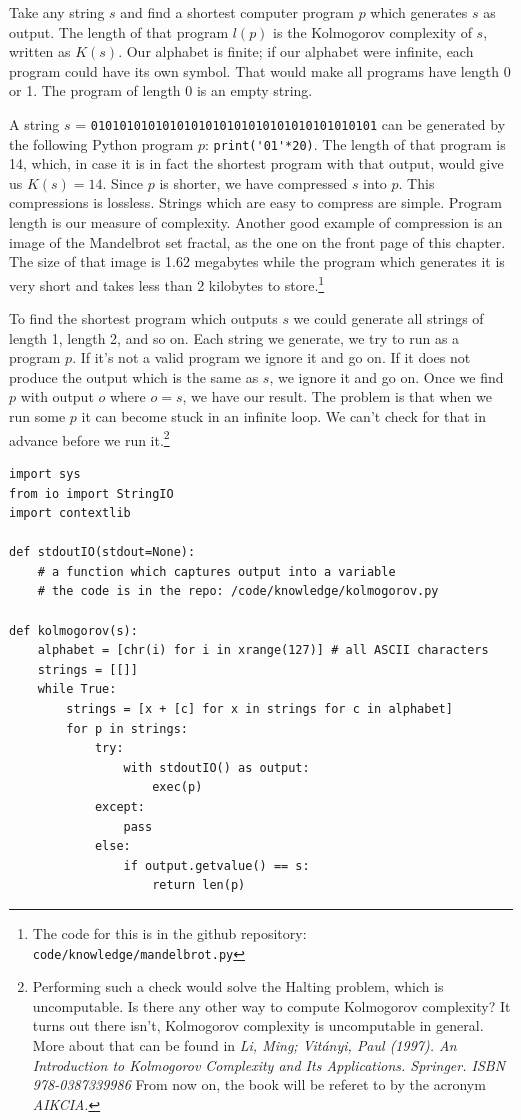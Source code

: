 Take any string $s$ and find a shortest computer program $p$ which generates $s$ as output.
The length of that program $l(p)$ is the Kolmogorov complexity of $s$, written as $K(s)$.
Our alphabet is finite; if our alphabet were infinite, each program could have its own symbol.
That would make all programs have length 0 or 1.
The program of length 0 is an empty string.

A string $s$ = \texttt{0101010101010101010101010101010101010101} can be generated by the following Python program $p$: \verb|print('01'*20)|.
The length of that program is 14, which, in case it is in fact the shortest program with that output, would give us $K(s) = 14$.
Since $p$ is shorter, we have compressed $s$ into $p$.
This compressions is lossless.
Strings which are easy to compress are simple.
Program length is our measure of complexity.
Another good example of compression is an image of the Mandelbrot set fractal, as the one on the front page of this chapter.
The size of that image is 1.62 megabytes while the program which generates it is very short and takes less than 2 kilobytes to store.\footnote{The code for this is in the github repository: \texttt{code/knowledge/mandelbrot.py}}

To find the shortest program which outputs $s$ we could generate all strings of length 1, length 2, and so on.
Each string we generate, we try to run as a program $p$.
If it's not a valid program we ignore it and go on.
If it does not produce the output which is the same as $s$, we ignore it and go on.
Once we find $p$ with output $o$ where $o = s$, we have our result.
The problem is that when we run some $p$ it can become stuck in an infinite loop.
We can't check for that in advance before we run it.\footnote{
Performing such a check would solve the Halting problem, which is uncomputable.
Is there any other way to compute Kolmogorov complexity?
It turns out there isn't, Kolmogorov complexity is uncomputable in general.
More about that can be found in \textit{Li, Ming; Vitányi, Paul (1997). An Introduction to Kolmogorov Complexity and Its Applications. Springer. ISBN 978-0387339986}
From now on, the book will be referet to by the acronym \textit{AIKCIA}.
}

\newpage

\begin{lstlisting}[caption={Computing the Kolmogorov complexity of a string. Do not run this at home.}]
import sys
from io import StringIO
import contextlib

def stdoutIO(stdout=None):
	# a function which captures output into a variable
	# the code is in the repo: /code/knowledge/kolmogorov.py

def kolmogorov(s):
	alphabet = [chr(i) for i in xrange(127)] # all ASCII characters
	strings = [[]]
	while True:
		strings = [x + [c] for x in strings for c in alphabet]
		for p in strings:
			try:
				with stdoutIO() as output:
					exec(p)
			except:
				pass
			else:
				if output.getvalue() == s:
					return len(p)
\end{lstlisting}

